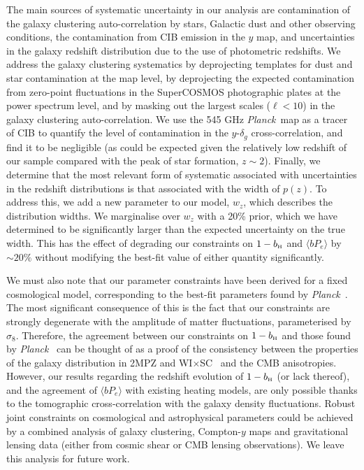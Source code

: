 \documentclass[useAMS,usenatbib]{mn2e}
\newcommand{\wisc}{WI$\times$SC}
\def\bH{b_{\scriptscriptstyle\rm H}}
\def\planck{{\it Planck\/}}
\begin{document}
  The main sources of systematic uncertainty in our analysis are contamination of the galaxy clustering auto-correlation by stars, Galactic dust and other observing conditions, the contamination from CIB emission in the $y$ map, and uncertainties in the galaxy redshift distribution due to the use of photometric redshifts. We address the galaxy clustering systematics by deprojecting templates for dust and star contamination at the map level, by deprojecting the expected contamination from zero-point fluctuations in the SuperCOSMOS photographic plates at the power spectrum level, and by masking out the largest scales ($\ell<10$) in the galaxy clustering auto-correlation. We use the 545 GHz \planck\ map as a tracer of CIB to quantify the level of contamination in the $y$-$\delta_g$ cross-correlation, and find it to be negligible (as could be expected given the relatively low redshift of our sample compared with the peak of star formation, $z\sim2$). Finally, we determine that the most relevant form of systematic associated with uncertainties in the redshift distributions is that associated with the width of $p(z)$. To address this, we add a new parameter to our model, $w_z$, which describes the distribution widths. We marginalise over $w_z$ with a 20\% prior, which we have determined to be significantly larger than the expected uncertainty on the true width. This has the effect of degrading our constraints on $1-\bH$ and $\langle bP_e\rangle$ by $\sim20\%$ without modifying the best-fit value of either quantity significantly.
  
  We must also note that our parameter constraints have been derived for a fixed cosmological model, corresponding to the best-fit parameters found by \planck\ \citep{2018arXiv180706209P}. The most significant consequence of this is the fact that our constraints are strongly degenerate with the amplitude of matter fluctuations, parameterised by $\sigma_8$. Therefore, the agreement between our constraints on $1-\bH$ and those found by \planck\ \citep{2016A&A...594A..24P} can be thought of as a proof of the consistency between the properties of the galaxy distribution in 2MPZ and \wisc~ and the CMB anisotropies. However, our results regarding the redshift evolution of $1-\bH$ (or lack thereof), and the agreement of $\langle bP_e\rangle$ with existing heating models, are only possible thanks to the tomographic cross-correlation with the galaxy density fluctuations. Robust joint constraints on cosmological and astrophysical parameters could be achieved by a combined analysis of galaxy clustering, Compton-$y$ maps and gravitational lensing data (either from cosmic shear or CMB lensing observations). We leave this analysis for future work.
  
\end{document}
